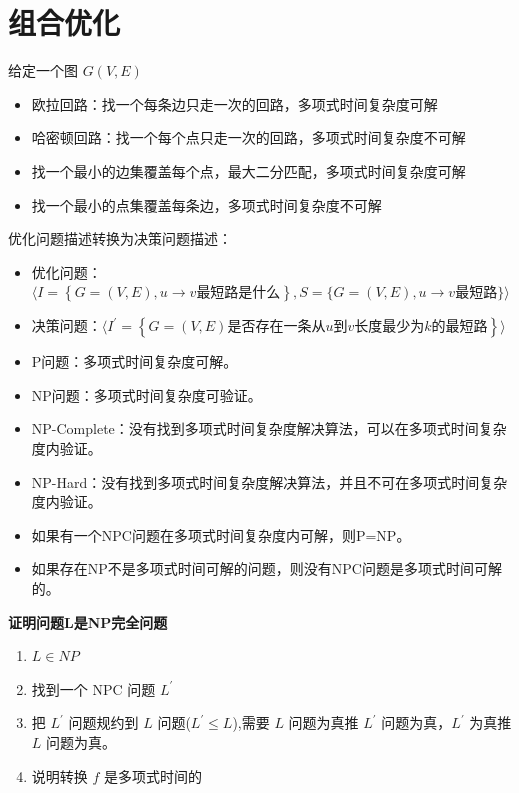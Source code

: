 \section{组合优化}
\begin{remark}
    给定一个图 $G(V, E)$\begin{itemize}
        \item 欧拉回路：找一个每条边只走一次的回路，多项式时间复杂度可解
        \item 哈密顿回路：找一个每个点只走一次的回路，多项式时间复杂度不可解
        \item 找一个最小的边集覆盖每个点，最大二分匹配，多项式时间复杂度可解
        \item 找一个最小的点集覆盖每条边，多项式时间复杂度不可解
    \end{itemize}
\end{remark}

\begin{remark}
    优化问题描述转换为决策问题描述：
    \begin{itemize}
        \item 优化问题：$\langle I = \left\{G=(V, E), u \to v \text{最短路是什么}\right\},S = \{G=(V, E), u \to v \text{最短路}\}\rangle$
        \item 决策问题：$\langle I^\prime = \left\{G=(V, E) \text{是否存在一条从} u \text{到} v \text{长度最少为} k \text{的最短路}\right\} \rangle$
    \end{itemize}
\end{remark}

\begin{remark}
    \text{}
    \begin{itemize}
		\item P问题：多项式时间复杂度可解。
		\item NP问题：多项式时间复杂度可验证。
		\item NP-Complete：没有找到多项式时间复杂度解决算法，可以在多项式时间复杂度内验证。
		\item NP-Hard：没有找到多项式时间复杂度解决算法，并且不可在多项式时间复杂度内验证。
        \item 如果有一个NPC问题在多项式时间复杂度内可解，则P=NP。
        \item 如果存在NP不是多项式时间可解的问题，则没有NPC问题是多项式时间可解的。
    \end{itemize}
\end{remark}

\begin{remark}
    \textbf{证明问题L是NP完全问题}\begin{enumerate}
        \item $L \in NP$
        \item 找到一个 NPC 问题 $L^\prime$
        \item 把 $L^\prime$ 问题规约到 $L$ 问题($L^\prime \le L$),需要 $L$ 问题为真推 $L^\prime$ 问题为真，$L^\prime$ 为真推 $L$ 问题为真。
        \item 说明转换 $f$ 是多项式时间的
    \end{enumerate}
\end{remark}

